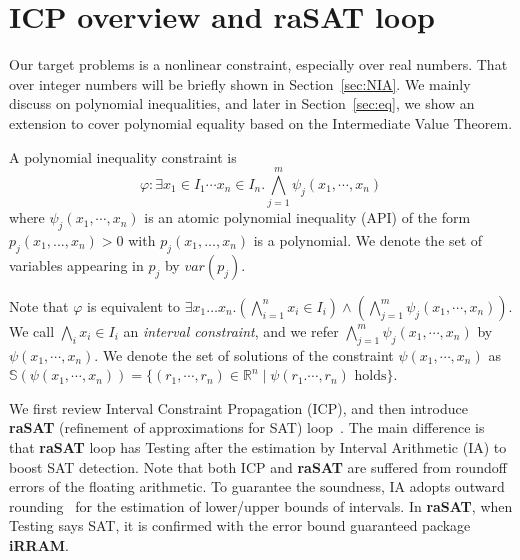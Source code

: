 \documentclass[runningheads,a4paper,oribibl]{llncs}
\newcommand{\Real}{{\mathbb R}}
\begin{document}
\section{ICP overview and \textbf{raSAT} loop}
\label{sec:raSATloop} 

\sloppy

Our target problems is a nonlinear constraint, especially over real numbers. 
That over integer numbers will be briefly shown in Section~\ref{sec:NIA}.
We mainly discuss on polynomial inequalities, and later in Section~\ref{sec:eq},
we show an extension to cover polynomial equality based on the
Intermediate Value Theorem. 

\begin{definition}
A polynomial inequality constraint is
\[\varphi: \exists x_1 \in I_1 \cdots x_n \in I_n. \bigwedge
\limits_{j=1}^m \psi_j(x_1,\cdots,x_n)\]
where $\psi_j(x_1,\cdots,x_n)$ is an atomic polynomial inequality (API) of
the form $p_j(x_1,...,x_n) > 0$ with $p_j(x_1,...,x_n)$ is a polynomial.
We denote the set of variables appearing in $p_j$ by $var(p_j)$. 
\end{definition}

Note that $\varphi$ is equivalent to 
${\exists x_1 \ldots x_n. (\bigwedge \limits_{i=1}^n x_i \in I_i) \wedge
  (\bigwedge \limits_{j=1}^m \psi_j(x_1,\cdots,x_n))}$. 
We call ${\bigwedge \limits_i x_i \in I_i}$ an {\em interval constraint}, and 
we refer $\bigwedge \limits_{j=1}^m \psi_j(x_1,\cdots,x_n)$ by
$\psi(x_1,\cdots,x_n)$.
We denote the set of solutions of the constraint $\psi(x_1,\cdots, x_n)$ as
${\mathbb{S}(\psi(x_1,\cdots, x_n)) = \{(r_1,\cdots, r_n) \in \Real^n \mid
  \psi(r_1. \cdots, r_n) \text{ holds}\}}$.

We first review Interval Constraint Propagation (ICP)\cite{benhamou:hal-00480814}, and then introduce
\textbf{raSAT} (refinement of approximations for SAT) loop~\cite{VanKhanh201227}.
The main difference is that {\bf raSAT} loop has Testing after the estimation
by Interval Arithmetic (IA) to boost SAT detection.
Note that both ICP and {\bf raSAT} are suffered from roundoff errors of
the floating arithmetic. To guarantee the soundness, IA adopts
outward rounding~\cite{Hickey:2001:IAP:502102.502106} for the estimation of lower/upper bounds of intervals.
In {\bf raSAT}, when Testing says SAT, it is confirmed with
the error bound guaranteed package {\bf iRRAM}. 
\end{document}
